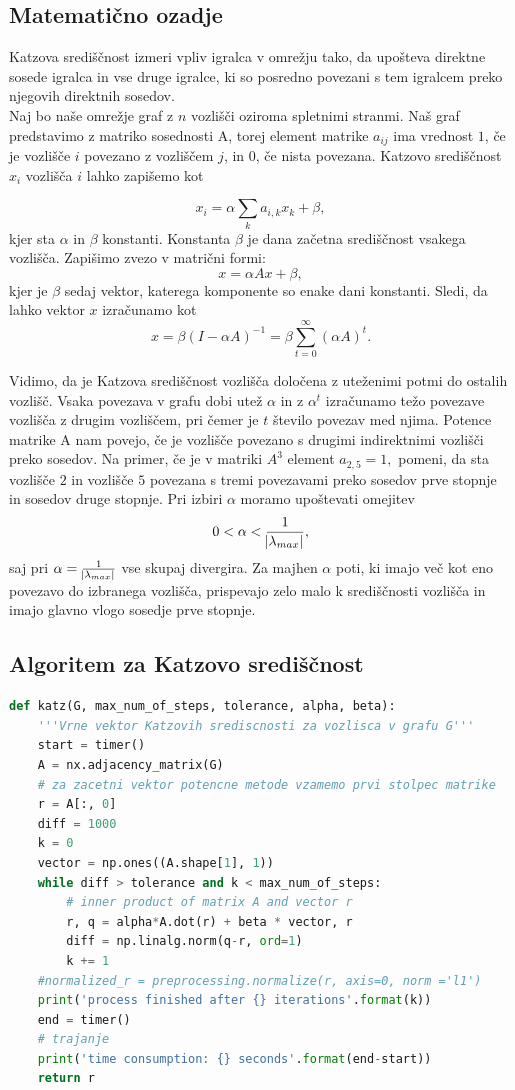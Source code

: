 \documentclass[a4paper]{article}
\begin{document}
\subsection{Matematično ozadje}


\hspace{4.8mm}Katzova središčnost izmeri vpliv igralca v omrežju tako, da upošteva direktne sosede igralca in vse druge igralce, ki so posredno povezani s tem igralcem preko njegovih direktnih sosedov. \\
Naj bo naše omrežje graf z $n$ vozlišči oziroma spletnimi stranmi. Naš graf predstavimo z matriko sosednosti A, torej element matrike $a_{ij}$ ima vrednost $1$, če je vozlišče $i$ povezano z vozliščem $j$, in $0$, če nista povezana. Katzovo središčnost $x_{i}$ vozlišča $i$ lahko zapišemo kot

$$x_{i} = \alpha\sum_{k}a_{i,k}x_{k} + \beta,$$
kjer sta $\alpha$ in $\beta$ konstanti. Konstanta $\beta$ je dana začetna središčnost vsakega vozlišča. Zapišimo zvezo v matrični formi:
$$x = \alpha Ax + \beta,$$
kjer je $\beta$ sedaj vektor, katerega komponente so enake dani konstanti. Sledi, da lahko vektor $x$ izračunamo kot
$$x = \beta (I - \alpha A)^{-1} = \beta \sum_{t=0}^{\infty} (\alpha A)^t. $$

Vidimo, da je Katzova središčnost vozlišča določena z uteženimi potmi do ostalih vozlišč. Vsaka povezava v grafu dobi utež $\alpha$ in z $\alpha^{t}$ izračunamo težo povezave vozlišča z drugim vozliščem, pri čemer je $t$ število povezav med njima. Potence matrike A nam povejo, če je vozlišče povezano s drugimi indirektnimi vozlišči preko sosedov. Na primer, če je v matriki $A^{3}$ element $a_{2,5}  = 1,$ pomeni, da sta vozlišče $2$ in vozlišče $5$ povezana s tremi povezavami preko sosedov prve stopnje in sosedov druge stopnje.
Pri izbiri $\alpha$ moramo upoštevati omejitev 
$$0 < \alpha < \frac{1}{\abs{\lambda_{max}}},$$
saj pri $\alpha = \frac{1}{\abs{\lambda_{max}}}$ vse skupaj divergira. Za majhen $\alpha$ poti, ki imajo več kot eno povezavo do izbranega vozlišča, prispevajo zelo malo k središčnosti vozlišča in imajo glavno vlogo sosedje prve stopnje.


\subsection{Algoritem za Katzovo središčnost}
\begin{lstlisting}[language=Python]
def katz(G, max_num_of_steps, tolerance, alpha, beta):
    '''Vrne vektor Katzovih srediscnosti za vozlisca v grafu G'''
    start = timer()
    A = nx.adjacency_matrix(G)
    # za zacetni vektor potencne metode vzamemo prvi stolpec matrike
    r = A[:, 0]  
    diff = 1000
    k = 0
    vector = np.ones((A.shape[1], 1))
    while diff > tolerance and k < max_num_of_steps:
        # inner product of matrix A and vector r
        r, q = alpha*A.dot(r) + beta * vector, r
        diff = np.linalg.norm(q-r, ord=1)
        k += 1
    #normalized_r = preprocessing.normalize(r, axis=0, norm ='l1')
    print('process finished after {} iterations'.format(k))
    end = timer()
    # trajanje 
    print('time consumption: {} seconds'.format(end-start))
    return r
\end{lstlisting}
\end{document}
